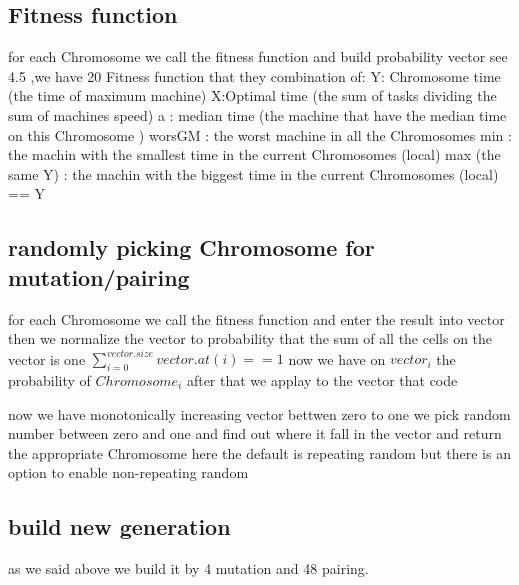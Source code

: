 \documentclass[11pt,fullpage]{article}
\begin{document}
\subsection{Fitness function} 
for each Chromosome we call the fitness function and build probability vector see 4.5 ,we have 20 Fitness function that they combination of:\newline
Y: Chromosome time (the time of maximum machine)\newline
X:Optimal time (the sum of tasks dividing the sum of machines speed)\newline
a : median time (the machine that have the median time on this Chromosome )
worsGM : the worst machine in all the Chromosomes\newline
min : the machin with the smallest time in the current Chromosomes (local)\newline
max (the same Y) : the machin with the biggest time in the current Chromosomes (local) == Y\newline

\subsection{randomly picking Chromosome for mutation/pairing  }
for each Chromosome we call the fitness function and enter the result into vector then we normalize the vector to probability  that the sum of all the cells on the vector is one $\sum\limits_{i=0}^{vector.size} vector.at(i) ==1$ now we have on $vector_i$ the probability of $Chromosome_i$ after that we applay to the vector that code

 now we have monotonically increasing  vector bettwen zero to one we pick random number between zero and one and find out where it fall in the vector and return the appropriate Chromosome\newline
here the default is repeating random but there is an option to enable non-repeating random
 
  \subsection{ build new generation}
 as we said above we build it by 4 mutation and 48 pairing.

 

\end{document}
